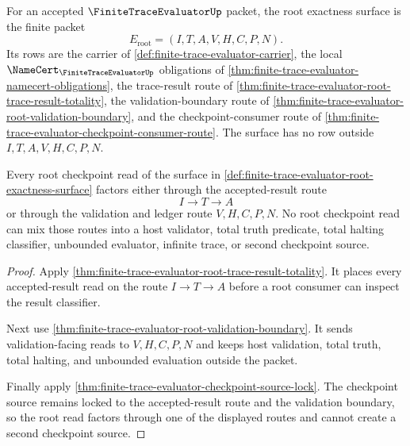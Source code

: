 \begin{definition}
\label{def:finite-trace-evaluator-root-exactness-surface}
For an accepted $\FiniteTraceEvaluatorUp$ packet, the root exactness surface is
the finite packet
$$
E_{\mathrm{root}}=(I,T,A,V,H,C,P,N).
$$
Its rows are the carrier of \autoref{def:finite-trace-evaluator-carrier}, the
local $\NameCert_{\FiniteTraceEvaluatorUp}$ obligations of
\autoref{thm:finite-trace-evaluator-namecert-obligations}, the trace-result
route of \autoref{thm:finite-trace-evaluator-root-trace-result-totality}, the
validation-boundary route of
\autoref{thm:finite-trace-evaluator-root-validation-boundary}, and the
checkpoint-consumer route of
\autoref{thm:finite-trace-evaluator-checkpoint-consumer-route}. The surface has
no row outside $I,T,A,V,H,C,P,N$.
\end{definition}

\begin{theorem}
\label{thm:finite-trace-evaluator-root-exactness-scope}
Every root checkpoint read of the surface in
\autoref{def:finite-trace-evaluator-root-exactness-surface} factors either
through the accepted-result route
$$
I \to T \to A
$$
or through the validation and ledger route $V,H,C,P,N$. No root checkpoint read
can mix those routes into a host validator, total truth predicate, total halting
classifier, unbounded evaluator, infinite trace, or second checkpoint source.
\end{theorem}
\begin{proof}
Apply \autoref{thm:finite-trace-evaluator-root-trace-result-totality}. It
places every accepted-result read on the route $I \to T \to A$ before a root
consumer can inspect the result classifier.

Next use \autoref{thm:finite-trace-evaluator-root-validation-boundary}. It
sends validation-facing reads to $V,H,C,P,N$ and keeps host validation, total
truth, total halting, and unbounded evaluation outside the packet.

Finally apply \autoref{thm:finite-trace-evaluator-checkpoint-source-lock}. The
checkpoint source remains locked to the accepted-result route and the
validation boundary, so the root read factors through one of the displayed
routes and cannot create a second checkpoint source.
\end{proof}

